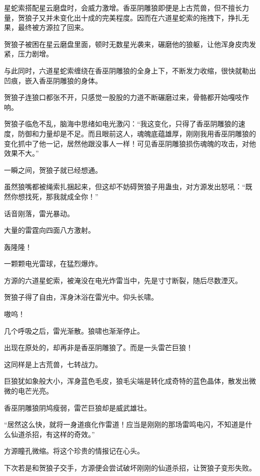 
\begin{this_body}



星蛇索搭配星云磨盘时，会威力激增。香巫阴雕狼即便是上古荒兽，但不擅长力量，贺狼子又并未变化出十成的完美程度。因而在六道星蛇索的拖拽下，挣扎无果，最终被方源拉了回来。

贺狼子被困在星云磨盘里面，顿时无数星光袭来，碾磨他的狼躯，让他浑身皮肉发紧，压力剧增。

与此同时，六道星蛇索缠绕在香巫阴雕狼的全身上下，不断发力收缩，很快就勒出凹痕，嵌入香巫阴雕狼的身体。

贺狼子连狼口都张不开，只感觉一股股的力道不断碾磨过来，骨骼都开始嘎吱作响。

贺狼子临危不乱，脑海中思绪如电光激闪：“我这变化，只得了香巫阴雕狼的速度，防御和力量却是不足。而且眼前这人，魂魄底蕴雄厚，刚刚我用香巫阴雕狼的变化抓中了他一记，居然他跟没事人一样！可见香巫阴雕狼损伤魂魄的攻击，对他效果不大。”

一瞬之间，贺狼子就已经想通。

虽然狼嘴都被绳索扎捆起来，但这却不妨碍贺狼子用蛊虫，对方源发出怒吼：“既然你想找死，那我就成全你！”

话音刚落，雷光暴动。

大量的雷霆向四面八方激射。

轰隆隆！

一颗颗电光雷球，在猛烈爆炸。

方源的六道星蛇索，被淹没在电光炸雷当中，先是寸寸断裂，随后尽数湮灭。

贺狼子得了自由，浑身沐浴在雷光中。仰头长啸。

嗷呜！

几个呼吸之后，雷光渐散。狼啸也渐渐停止。

出现在原处的，却再非是香巫阴雕狼了。而是一头雷芒巨狼！

这同样是上古荒兽，七转战力。

巨狼犹如象般大小，浑身蓝色毛皮，狼毛尖端是转化成奇特的蓝色晶体，散发出微微的电芒光亮。

香巫阴雕狼阴鸠瘦弱，雷芒巨狼却是威武雄壮。

“居然这么快，就将一身道痕化作雷道！应当是刚刚的那场雷鸣电闪，不知道是什么仙道杀招，有这样的奇效。”

方源瞳孔微缩。将这个珍贵的情报记在心头。

下次若是和贺狼子交手，方源便会尝试破坏刚刚的仙道杀招，让贺狼子变形失败。


\end{this_body}
